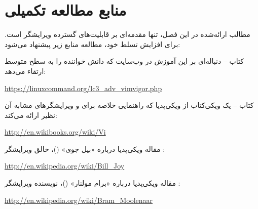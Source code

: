 \section{منابع مطالعه تکمیلی}

مطالب ارائه‌شده در این فصل، تنها مقدمه‌ای بر قابلیت‌های گسترده ویرایشگر  است. برای افزایش تسلط خود، مطالعه منابع زیر پیشنهاد می‌شود:

کتاب  – دنباله‌ای بر این آموزش در وب‌سایت  که دانش خواننده را به سطح متوسط ارتقاء می‌دهد:

\begin{latin}
\url{https://linuxcommand.org/lc3_adv_vimvigor.php}
\end{latin}

کتاب  – یک ویکی‌کتاب از ویکی‌پدیا که راهنمایی خلاصه برای  و ویرایشگرهای مشابه آن نظیر  ارائه می‌کند:

\begin{latin}
\url{http://en.wikibooks.org/wiki/Vi}
\end{latin}

مقاله ویکی‌پدیا درباره «بیل جوی» ()، خالق ویرایشگر :

\begin{latin}
\url{http://en.wikipedia.org/wiki/Bill_Joy}
\end{latin}

مقاله ویکی‌پدیا درباره «برام مولنار» ()، نویسنده ویرایشگر :

\begin{latin}
\url{http://en.wikipedia.org/wiki/Bram_Moolenaar}
\end{latin}